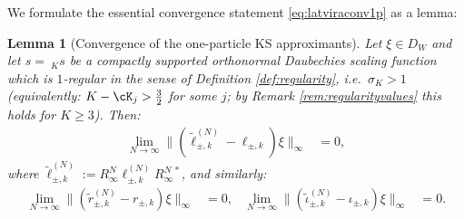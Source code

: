 \documentclass[a4paper, 11pt]{article}
\DeclareMathOperator{\1}{\mathds{1}}
\newtheorem{lemma}[thm]{Lemma}
\begin{document}
We formulate the essential convergence statement \eqref{eq:latviraconv1p} as a lemma:
\begin{lemma}[Convergence of the one-particle KS approximants]
\label{lem:KSconv}
Let $\xi\in D_{W}$ and let $s=\!\ _{K}s$ be a compactly supported orthonormal Daubechies scaling function which is $1$-regular in the sense of Definition \ref{def:regularity}, i.e.~$\sigma_{K}>1$ (equivalently: $K-\cK_{j}>\tfrac{3}{2}$ for some $j$; by Remark \ref{rem:regularityvalues} this holds for $K\geq3$). Then:
\begin{align*}
\lim_{N\rightarrow\infty}\|(\tilde{\ell}^{(N)}_{\pm,k} - \ell_{\pm,k})\xi\|_{\infty} & = 0,
\end{align*}
where $\tilde{\ell}^{(N)}_{\pm,k}:=R^{N}_{\infty}\ell^{(N)}_{\pm,k}R^{N\!\ *}_{\infty}$, and similarly:
\begin{align*}
\lim_{N\rightarrow\infty}\|(\tilde{r}^{(N)}_{\pm,k} - r_{\pm,k})\xi\|_{\infty} & = 0, & \lim_{N\rightarrow\infty}\|(\tilde{\iota}^{(N)}_{\pm,k} - \iota_{\pm,k})\xi\|_{\infty} & = 0.
\end{align*} 
\end{lemma}
\end{document}
